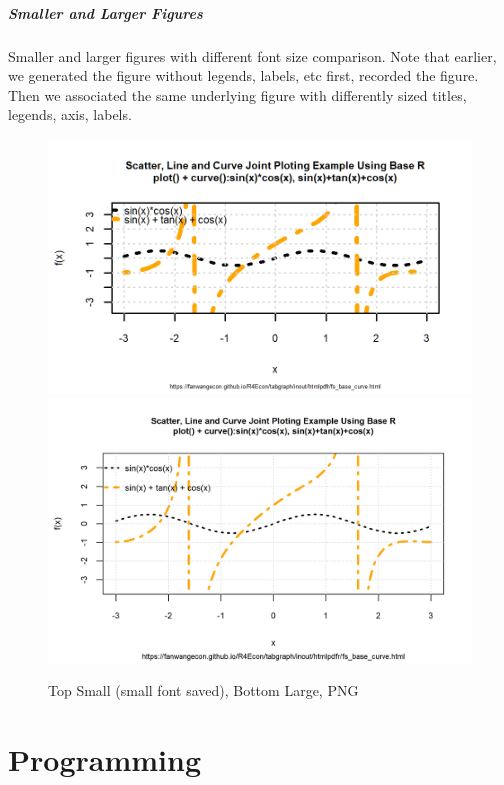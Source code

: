 \documentclass[
]{book}
\begin{document}
\hypertarget{smaller-and-larger-figures}{%
\paragraph{Smaller and Larger Figures}\label{smaller-and-larger-figures}}

Smaller and larger figures with different font size comparison. Note that earlier, we generated the figure without legends, labels, etc first, recorded the figure. Then we associated the same underlying figure with differently sized titles, legends, axis, labels.

\begin{figure}
\centering
\caption{Top Small (small font saved), Bottom Large, PNG}
\includegraphics[width=\linewidth]{_img/fs_img_io_2curve_w80h48_res300.png}
\hfill
\centering
\includegraphics[width=\linewidth]{_img/fs_img_io_2curve_w160h100_res300.png}
\end{figure}

\hypertarget{programming}{%
\chapter{Programming}\label{programming}}
\end{document}
